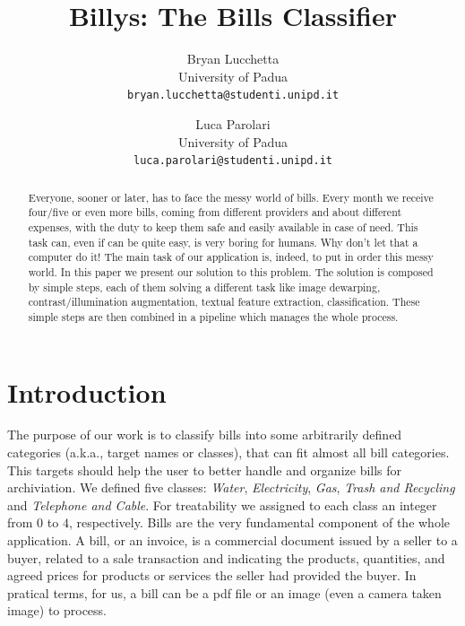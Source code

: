 \documentclass[10pt,twocolumn,letterpaper]{article}
\begin{document}
\title{Billys: The Bills Classifier}

\author{Bryan Lucchetta\\
{\small University of Padua}\\
{\tt\small bryan.lucchetta@studenti.unipd.it}
\and
Luca Parolari\\
{\small University of Padua}\\
{\tt\small luca.parolari@studenti.unipd.it}
}

\maketitle


\begin{abstract}
Everyone, sooner or later, has to face the messy world of bills. Every
month we receive four/five or even more bills, coming from different
providers and about different expenses, with the duty to keep them
safe and easily available in case of need. This task can, even if can
be quite easy, is very boring for humans. Why don't let that a
computer do it! The main task of our application is, indeed, to put in
order this messy world.  In this paper we present our solution to this
problem. The solution is composed by simple steps, each of them solving
a different task like image dewarping, contrast/illumination
augmentation, textual feature extraction, classification. These simple
steps are then combined in a pipeline which manages the whole process.
\end{abstract}


\section{Introduction}

The purpose of our work is to classify bills into some arbitrarily
defined categories (a.k.a., target names or classes), that can
fit almost all bill categories. This targets should help the user to
better handle and organize bills for archiviation. We defined five
classes: \emph{Water}, \emph{Electricity}, \emph{Gas}, \emph{Trash and
  Recycling} and \emph{Telephone and Cable}. For treatability we
assigned to each class an integer from $0$ to $4$,
respectively. Bills are the very fundamental component of the whole
application. A bill, or an invoice, is a commercial document issued by
a seller to a buyer, related to a sale transaction and indicating the
products, quantities, and agreed prices for products or services the
seller had provided the buyer. In pratical terms, for us, a bill can
be a pdf file or an image (even a camera taken image) to process.
\end{document}
